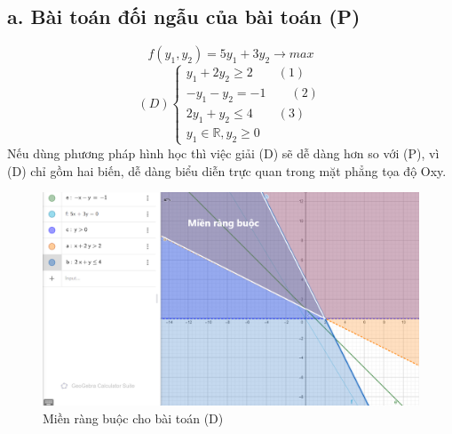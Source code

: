 \documentclass[12pt,a4paper]{article}
\begin{document}
		\subsection*{a. Bài toán đối ngẫu của bài toán (P)}
		\[f(y_1, y_2) = 5y_1 + 3y_2 \rightarrow max\]
		\[(D) \begin{cases}
			y_1 + 2y_2 \geq 2 \qquad (1)\\
			-y_1 - y_2 = -1 \qquad (2)\\
			2y_1 + y_2 \leq 4 \qquad (3)\\
			y_1 \in \mathbb{R}, y_2 \geq 0
		\end{cases}\]
			Nếu dùng phương pháp hình học thì việc giải (D) sẽ dễ dàng hơn so với (P), vì (D) chỉ gồm hai biến, dễ dàng biểu diễn trực quan trong mặt phẳng tọa độ Oxy.
		\begin{center}
			\begin{figure}[H]
				\begin{center}
					\includegraphics[scale=.4]{img/mienrangbuoc}
				\end{center}
				\caption{Miền ràng buộc cho bài toán (D)}
			\end{figure}
		\end{center}
\end{document}

